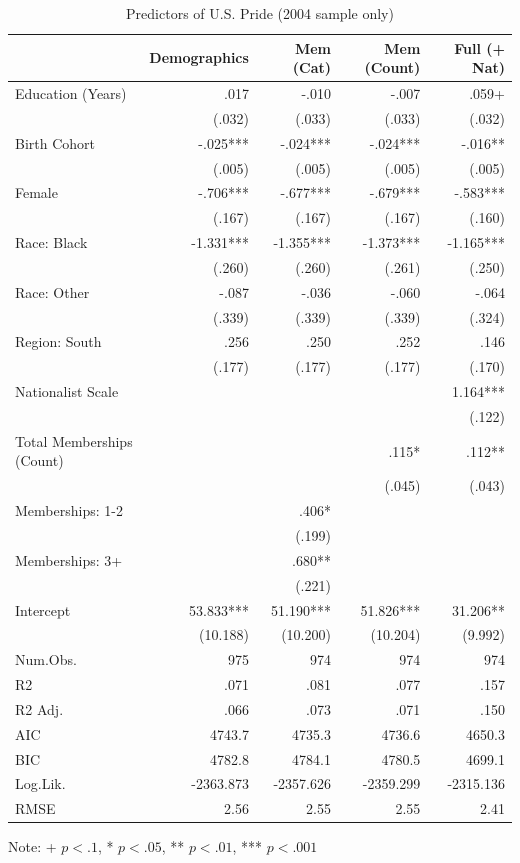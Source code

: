 \begin{table}[htbp]
\centering
\begin{threeparttable}
\caption{Predictors of U.S. Pride (2004 sample only)}
\label{tab:full2004}
\small
\begin{tabular}{lrrrr}
\toprule
& Demographics & Mem (Cat) & Mem (Count) & Full (+ Nat) \\
\midrule
Education (Years) & .017 & -.010 & -.007 & .059+ \\
& (.032) & (.033) & (.033) & (.032) \\
Birth Cohort & -.025*** & -.024*** & -.024*** & -.016** \\
& (.005) & (.005) & (.005) & (.005) \\
Female & -.706*** & -.677*** & -.679*** & -.583*** \\
& (.167) & (.167) & (.167) & (.160) \\
Race: Black & -1.331*** & -1.355*** & -1.373*** & -1.165*** \\
& (.260) & (.260) & (.261) & (.250) \\
Race: Other & -.087 & -.036 & -.060 & -.064 \\
& (.339) & (.339) & (.339) & (.324) \\
Region: South & .256 & .250 & .252 & .146 \\
& (.177) & (.177) & (.177) & (.170) \\
Nationalist Scale &  &  &  & 1.164*** \\
&  &  &  & (.122) \\
Total Memberships (Count) &  &  & .115* & .112** \\
&  &  & (.045) & (.043) \\
Memberships: 1-2 &  & .406* &  & \\
&  & (.199) &  & \\
Memberships: 3+ &  & .680** &  & \\
&  & (.221) &  & \\
Intercept & 53.833*** & 51.190*** & 51.826*** & 31.206** \\
& (10.188) & (10.200) & (10.204) & (9.992) \\
Num.Obs. & 975 & 974 & 974 & 974 \\
R2 & .071 & .081 & .077 & .157 \\
R2 Adj. & .066 & .073 & .071 & .150 \\
AIC & 4743.7 & 4735.3 & 4736.6 & 4650.3 \\
BIC & 4782.8 & 4784.1 & 4780.5 & 4699.1 \\
Log.Lik. & -2363.873 & -2357.626 & -2359.299 & -2315.136 \\
RMSE & 2.56 & 2.55 & 2.55 & 2.41 \\
\bottomrule
\end{tabular}
\begin{tablenotes}
\small
\item Note: + $p < .1$, * $p < .05$, ** $p < .01$, *** $p < .001$
\end{tablenotes}
\end{threeparttable}
\end{table}
